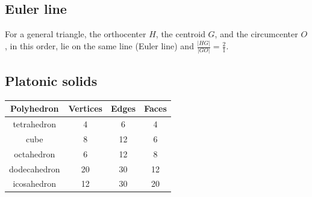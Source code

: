 \subsection*{Euler line}
For a general triangle, the orthocenter $H$, the centroid $G$, 
and the circumcenter $O$, in this order, lie on the same line (Euler line) 
and $\frac{|HG|}{|GO|} = \frac{2}{1}$.

\subsection*{Platonic solids}
\begin{tabular}{ |c|c|c|c| } 
\hline
Polyhedron & Vertices & Edges & Faces \\ 
\hline
tetrahedron & 4 & 6 & 4 \\ 
\hline
cube & 8 & 12 & 6 \\ 
\hline
octahedron & 6 & 12 & 8 \\
\hline
dodecahedron & 20 & 30 & 12 \\
\hline
icosahedron & 12 & 30 & 20 \\
\hline
\end{tabular}
 
